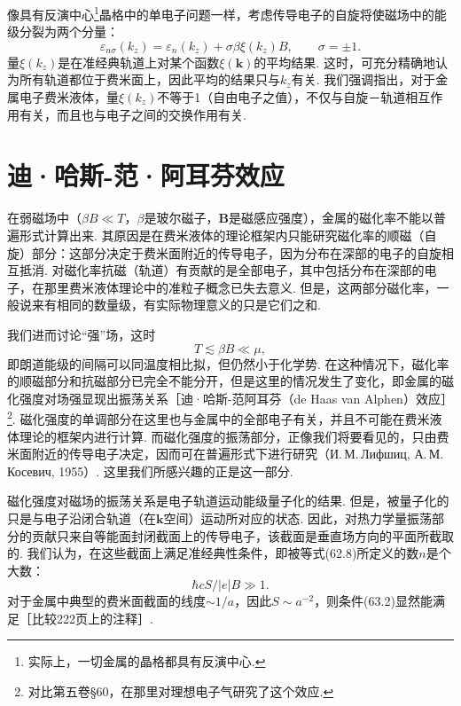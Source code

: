 像具有反演中心\footnote{实际上，一切金属的晶格都具有反演中心.}晶格中的单电子问题一样，考虑传导电子的自旋将使磁场中的能级分裂为两个分量：
\begin{equation}
\varepsilon_{n\sigma}(k_z)=\varepsilon_n(k_z)+\sigma\beta\xi(k_z)B,
\qquad \sigma=\pm1.
\end{equation}
量$\xi(k_z)$是在准经典轨道上对某个函数$\xi(\bm{k})$的平均结果. 这时，可充分精确地认为所有轨道都位于费米面上，因此平均的结果只与$k_z$有关. 我们强调指出，对于金属电子费米液体，量$\xi(k_z)$不等于1（自由电子之值），不仅与自旋－轨道相互作用有关，而且也与电子之间的交换作用有关.

\section{迪·哈斯-范·阿耳芬效应}

在弱磁场中（$\beta B\ll T$，$\beta$是玻尔磁子，$\bm{B}$是磁感应强度），金属的磁化率不能以普遍形式计算出来. 其原因是在费米液体的理论框架内只能研究磁化率的顺磁（自旋）部分：这部分决定于费米面附近的传导电子，因为分布在深部的电子的自旋相互抵消. 对磁化率抗磁（轨道）有贡献的是全部电子，其中包括分布在深部的电子，在那里费米液体理论中的准粒子概念已失去意义. 但是，这两部分磁化率，一般说来有相同的数量级，有实际物理意义的只是它们之和.

我们进而讨论“强”场，这时
\begin{equation}
T\lesssim\beta B\ll\mu,
\end{equation}
即朗道能级的间隔可以同温度相比拟，但仍然小于化学势. 在这种情况下，磁化率的顺磁部分和抗磁部分已完全不能分开，但是这里的情况发生了变化，即金属的磁化强度对场强显现出振荡关系［迪·哈斯-范阿耳芬（de Haas van Alphen）效应］\footnote{对比第五卷§60，在那里对理想电子气研究了这个效应.}. 磁化强度的单调部分在这里也与金属中的全部电子有关，并且不可能在费米液体理论的框架内进行计算. 而磁化强度的振荡部分，正像我们将要看见的，只由费米面附近的传导电子决定，因而可在普遍形式下进行研究（И.\,М.\,Лифшиц, А.\,М.\,Косевич, 1955）. 这里我们所感兴趣的正是这一部分.

磁化强度对磁场的振荡关系是电子轨道运动能级量子化的结果. 但是，被量子化的只是与电子沿闭合轨道（在$\bm{k}$空间）运动所对应的状态. 因此，对热力学量振荡部分的贡献只来自等能面封闭截面上的传导电子，该截面是垂直场方向的平面所截取的. 我们认为，在这些截面上满足准经典性条件，即被等式(62.8)所定义的数$n$是个大数：
\begin{equation}
\hbar cS/|e|B\gg1.
\end{equation}
对于金属中典型的费米面截面的线度$\sim1/a$，因此$S\sim a^{-2}$，则条件(63.2)显然能满足［比较222页上的注释］.

